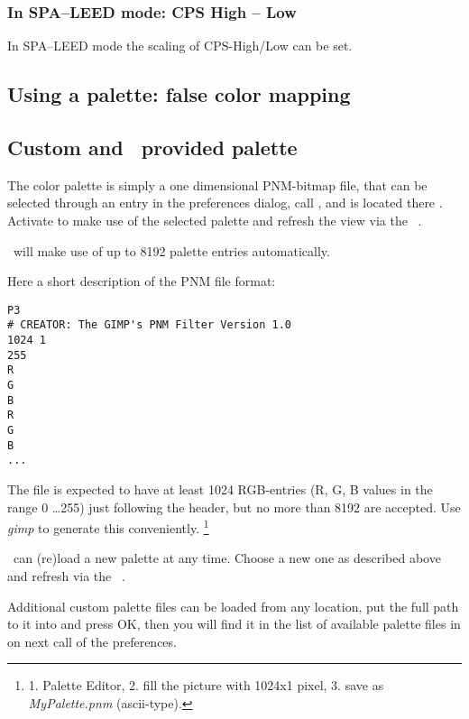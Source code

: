 
\subsubsection{In SPA--LEED mode: CPS High -- Low}
\label{CPShi-lo}

In SPA--LEED mode the scaling of CPS-High/Low can be set.

\subsection{Using a palette: false color mapping}

\subsection{Custom and \Gxsm\ provided palette}
\label{color-custom}
The color palette is simply a one dimensional PNM-bitmap file, that
can be selected through an entry in the preferences dialog, call
, and is located there
.  Activate 
to make use of the selected palette and refresh the view via 
the \Gxsm\ .

\Gxsm\ will make use of up to 8192 palette entries automatically.

Here a short description of the PNM file format:

\begin{verbatim}
P3
# CREATOR: The GIMP's PNM Filter Version 1.0
1024 1
255
R
G
B
R
G
B
...
\end{verbatim}


The file is expected to have at least 1024 RGB-entries (R, G, B values in the range 0 \dots 255)
just following the header, but no more than 8192 are accepted.
Use \emph{gimp} to generate this conveniently.
\footnote{1. Palette Editor, 2. fill the picture with 1024x1 pixel,
3. save as \emph{MyPalette.pnm} (ascii-type).}

\Gxsm\ can (re)load a new palette at any time. Choose a new one as
described above and refresh via the \Gxsm\ .

Additional custom palette files can be loaded from any location, put
the full path to it into  and press
OK, then you will find it in the list of available palette files in
 on next call of the preferences.

